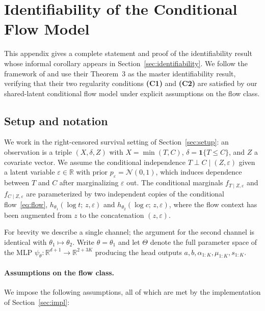 \section{Identifiability of the Conditional Flow Model}
\label{app:identifiability}

This appendix gives a complete statement and proof of the identifiability
result whose informal corollary appears in
Section~\ref{sec:identifiability}. We follow the framework of
\citet{czado2023dependent} and use their Theorem~3 as the master
identifiability result, verifying that their two regularity conditions
\textbf{(C1)} and \textbf{(C2)} are satisfied by our shared-latent
conditional flow model under explicit assumptions on the flow class.

\subsection{Setup and notation}
\label{app:setup}

We work in the right-censored survival setting of
Section~\ref{sec:setup}: an observation is a triple $(X, \delta, Z)$
with $X = \min(T, C)$, $\delta = \mathbf{1}\{T \le C\}$, and $Z$ a
covariate vector. We assume the conditional independence
$T \perp C \mid (Z, \varepsilon)$ given a latent variable
$\varepsilon \in \mathbb{R}$ with prior $p_\varepsilon = \mathcal{N}(0, 1)$,
which induces dependence between $T$ and $C$ after marginalizing
$\varepsilon$ out. The conditional marginals $f_{T \mid Z, \varepsilon}$
and $f_{C \mid Z, \varepsilon}$ are parameterized by two independent
copies of the conditional flow~\eqref{eq:flow},
$h_{\theta_1}(\log t;\, z, \varepsilon)$ and
$h_{\theta_2}(\log c;\, z, \varepsilon)$, where the flow context has
been augmented from $z$ to the concatenation $(z, \varepsilon)$.

For brevity we describe a single channel; the argument for the second
channel is identical with $\theta_1 \mapsto \theta_2$. Write
$\theta = \theta_1$ and let $\Theta$ denote the full parameter space of
the MLP $\psi_\theta : \mathbb{R}^{d + 1} \to \mathbb{R}^{2 + 3K}$
producing the head outputs $a, b, \alpha_{1:K}, \mu_{1:K}, s_{1:K}$.

\paragraph{Assumptions on the flow class.}
We impose the following assumptions, all of which are met by the
implementation of Section~\ref{sec:impl}:

